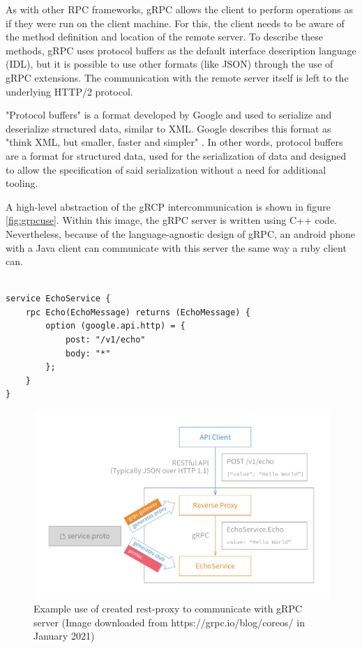 \documentclass[conference]{IEEEtran}
\begin{document}
As with other RPC frameworks, gRPC allows the client to perform operations as if they were run on the client machine. For this, the client needs to be aware of the method definition and location of the remote server. To describe these methods, gRPC uses protocol buffers \cite{protoBuffer} as the default interface description language (IDL), but it is possible to use other formats (like JSON) through the use of gRPC extensions. The communication with the remote server itself is left to the underlying HTTP/2 protocol. 

"Protocol buffers" is a format developed by Google and used to serialize and deserialize structured data, similar to XML. Google describes this format as "think XML, but smaller, faster and simpler" \cite{protoBuffer}. In other words, protocol buffers are a format for structured data, used for the serialization of data and designed to allow the specification of said serialization without a need for additional tooling.

A high-level abstraction of the gRCP intercommunication is shown in figure \ref{fig:grpcuse}. Within this image, the gRPC server is written using C++ code. Nevertheless, because of the language-agnostic design of gRPC, an android phone with a Java client can communicate with this server the same way a ruby client can.

\begin{lstlisting}[name={Small sample proto buffer specification (Full example available at https://grpc.io/blog/coreos/)},label={code:grpcproto}]  % Start your code-block

service EchoService {
	rpc Echo(EchoMessage) returns (EchoMessage) {
		option (google.api.http) = {
			post: "/v1/echo"
			body: "*"
		};
	}
}
\end{lstlisting}

\begin{figure}
	\centering
	\includegraphics[width=0.8\linewidth]{grpc-rest-gateway.png}
	\caption{Example use of created rest-proxy to communicate with gRPC server (Image downloaded from https://grpc.io/blog/coreos/ in January 2021)}
	\label{fig:restProxy}
\end{figure}
\end{document}
